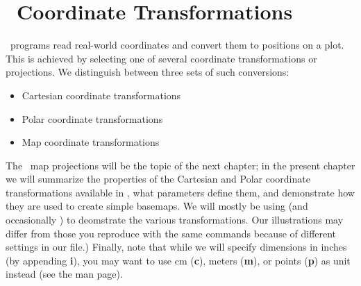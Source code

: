 %
%
\chapter{\gmt\ Coordinate Transformations}
\thispagestyle{headings}

\GMT\ programs read real-world coordinates and convert them to positions on a plot.
This is achieved by selecting one of several coordinate transformations or projections.
We distinguish between three sets of such conversions:

\begin{itemize}
\item Cartesian coordinate transformations
\item Polar coordinate transformations
\item Map coordinate transformations
\end{itemize}

The \GMT\ map projections will be the topic of the next chapter; in the present chapter
we will summarize the properties of the Cartesian and Polar coordinate transformations available in \GMT, what
parameters define them, and demonstrate how they are used to create simple
basemaps.  We will mostly be using  (and occasionally ) to
deomstrate the various transformations.  Our illustrations may differ from those you reproduce with the same
commands because of different settings in our
 file.)  Finally, note that while we will
specify dimensions in inches (by appending {\bf i}), you may
want to use cm ({\bf c}), meters ({\bf m}), or points ({\bf p})
as unit instead (see the  man page). 



